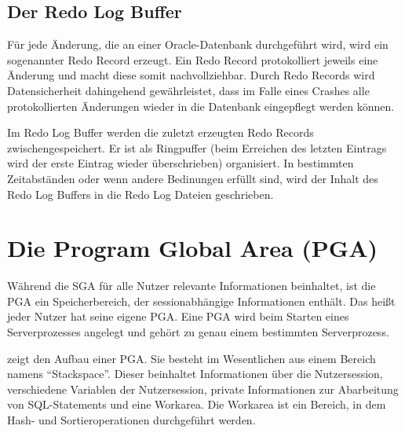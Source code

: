       \subsection{Der Redo Log Buffer}
        Für jede Änderung, die an einer Oracle-Datenbank durchgeführt wird, wird ein sogenannter Redo Record erzeugt. Ein Redo Record protokolliert jeweils eine Änderung und macht diese somit nachvollziehbar. Durch Redo Records wird Datensicherheit dahingehend gewährleistet, dass im Falle eines Crashes alle protokollierten Änderungen wieder in die Datenbank eingepflegt werden können.


        Im Redo Log Buffer werden die zuletzt erzeugten Redo Records zwischengespeichert. Er ist als Ringpuffer (beim Erreichen des letzten Eintrags wird der erste Eintrag wieder über\-schrie\-ben) organisiert. In bestimmten Zeitabständen oder wenn andere Bedinungen erfüllt sind, wird der Inhalt des Redo Log Buffers in die Redo Log Dateien geschrieben.

    \section{Die Program Global Area (PGA)}
      Während die SGA für alle Nutzer relevante Informationen beinhaltet, ist die PGA ein Speicherbereich, der sessionabhängige Informationen enthält. Das heißt jeder Nutzer hat seine eigene PGA. Eine PGA wird beim Starten eines Serverprozesses angelegt und gehört zu genau einem bestimmten Serverprozess.


       zeigt den Aufbau einer PGA. Sie besteht im Wesentlichen aus einem Bereich namens \enquote{Stackspace}. Dieser beinhaltet Informationen über die Nutzersession, verschiedene Variablen der Nutzersession, private Informationen zur Abarbeitung von SQL-Statements und eine Workarea. Die Workarea ist ein Bereich, in dem Hash- und Sortieroperationen durchgeführt werden.

      \begin{literaturinternet}
        \item \cite{CNCPT1237}
      \end{literaturinternet}
